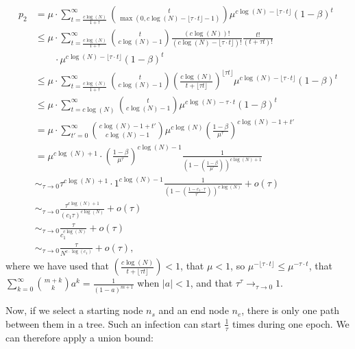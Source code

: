 \begin{align*}
p_2 &= \mu \cdot \displaystyle\sum_{t=\frac{c\log(N)}{1+\tau}}^{\infty}  {t \choose \max(0, c\log(N) -\lfloor \tau\cdot t \rfloor - 1)}  \mu^{c\log(N) -\lfloor \tau\cdot t \rfloor}(1-\beta)^{t} \\
&\leq \mu \cdot \displaystyle\sum_{t=\frac{c\log(N)}{1+\tau}}^{\infty}   {t \choose c\log(N) - 1}\frac{(c\log(N))!}{(c\log(N) -\lfloor \tau\cdot t \rfloor)!}\frac{t!}{(t+ \tau t)!} \\
&\qquad \cdot \mu^{c\log(N) -\lfloor \tau\cdot t \rfloor}(1-\beta)^{t} \\
&\leq \mu \cdot \displaystyle\sum_{t=\frac{c\log(N)}{1+\tau}}^{\infty}  {t \choose c\log(N) - 1}\left(\frac{c\log(N)}{t+ \lfloor \tau t \rfloor}\right)^{\lfloor \tau t\rfloor } \mu^{c\log(N) -\lfloor \tau\cdot t \rfloor}(1-\beta)^{t} \\
&\leq \mu \cdot \displaystyle\sum_{t=c\log(N)}^{\infty}  {t \choose c\log(N) - 1} \mu^{c\log(N) - \tau\cdot t}(1-\beta)^{t} \\
&= \mu \cdot \displaystyle\sum_{t'=0}^{\infty} {c\log(N)-1+t' \choose c\log(N)-1} \mu^{c\log(N)}\left(\frac{1-\beta}{\mu^\tau}\right)^{c\log(N) - 1 + t'} \\
&= \mu^{c\log(N) + 1}  \cdot \left(\frac{1-\beta}{\mu^\tau}\right)^{c\log(N) - 1} \frac{1}{\left(1-\left(\frac{1-\beta}{\mu^\tau}\right)\right)^{c\log(N)+1}} \\
&\sim_{\tau \to 0} \tau^{c\log(N) + 1}  \cdot 1^{c\log(N) - 1}  \frac{1}{\left(1-\left(\frac{1-c_1\cdot \tau}{\tau^{\tau}}\right)\right)^{c\log(N)}} + o(\tau)\\
&\sim_{\tau \to 0} \frac{\tau^{c\log(N) + 1}}{(c_1 \tau)^{c\log(N)}} + o(\tau) \\
&\sim_{\tau \to 0} \frac{\tau}{c_1^{c\log(N)}} + o(\tau)\\
&\sim_{\tau \to 0} \frac{\tau}{N^{c\cdot\log(c_1)}} + o(\tau),
\end{align*}
where we have used that $\left(\frac{c\log(N)}{t+ \lfloor \tau t \rfloor}\right) < 1$, that $\mu < 1$, so $\mu^{-\lfloor \tau\cdot t \rfloor} \leq \mu^{- \tau\cdot t}$, that $\displaystyle\sum_{k=0}^{\infty} {m + k \choose k} a^{k} = \frac{1}{(1-a)^{m+1}}$ when $|a| < 1$, and that $\tau^\tau \to_{\tau \to 0} 1$.

Now, if we select a starting node $n_s$ and an end node $n_e$, there is only one path between them in a tree. Such an infection can start $\frac{1}{\tau}$ times during one epoch. We can therefore apply a union bound:

